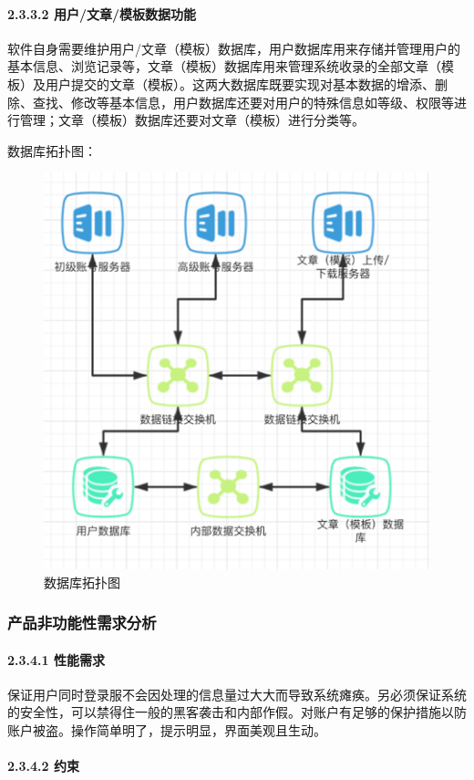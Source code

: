 \documentclass[10pt,letterpaper]{article}
\begin{document}
\paragraph{2.3.3.2 用户/文章/模板数据功能}
\rule{0pt}{0pt} 

软件自身需要维护用户/文章（模板）数据库，用户数据库用来存储并管理用户的基本信息、浏览记录等，文章（模板）数据库用来管理系统收录的全部文章（模板）及用户提交的文章（模板）。这两大数据库既要实现对基本数据的增添、删除、查找、修改等基本信息，用户数据库还要对用户的特殊信息如等级、权限等进行管理；文章（模板）数据库还要对文章（模板）进行分类等。

数据库拓扑图：

\begin{figure}[H]
	\begin{center}
		\includegraphics[width=0.5\linewidth]{___11.png}
		\caption{数据库拓扑图}
		\label{Fig:1}
	\end{center}
	\vspace{-0.5em}
\end{figure}

\subsubsection{产品非功能性需求分析}
\paragraph{2.3.4.1 性能需求}
\rule{0pt}{0pt} 

保证用户同时登录服不会因处理的信息量过大大而导致系统瘫痪。另必须保证系统的安全性，可以禁得住一般的黑客袭击和内部作假。对账户有足够的保护措施以防账户被盗。操作简单明了，提示明显，界面美观且生动。
\paragraph{2.3.4.2 约束}
\rule{0pt}{0pt} 
\end{document}
